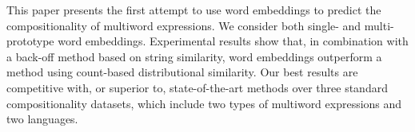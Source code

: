 This paper presents the first attempt to use word embeddings to predict the compositionality of multiword expressions. We consider both single- and multi-prototype word embeddings. Experimental results show that, in combination with a back-off method based on string similarity, word embeddings outperform a method using count-based distributional similarity. Our best results are competitive with, or superior to, state-of-the-art methods over three standard compositionality datasets, which include two types of multiword expressions and two languages.

